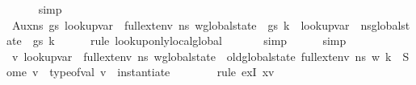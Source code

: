 \begin{isabellebody}
\ \ \ \ \isamarkupfalse%
\ simp\isanewline
\ \ \isamarkupfalse%
\ Aux{}{\isacharcolon}{\kern0pt}{\isachardoublequoteopen}{\isasymAnd}n{\isacharunderscore}{\kern0pt}s\ gs{\isachardot}{\kern0pt}\ lookup{\isacharunderscore}{\kern0pt}var\ {\isasymLambda}\ {\isacharparenleft}{\kern0pt}{\isacharparenleft}{\kern0pt}full{\isacharunderscore}{\kern0pt}ext{\isacharunderscore}{\kern0pt}env\ n{\isacharunderscore}{\kern0pt}s\ w{\isacharparenright}{\kern0pt}{\isasymlparr}global{\isacharunderscore}{\kern0pt}state\ {\isacharcolon}{\kern0pt}{\isacharequal}{\kern0pt}\ gs{\isasymrparr}{\isacharparenright}{\kern0pt}\ k\ {\isacharequal}{\kern0pt}\ lookup{\isacharunderscore}{\kern0pt}var\ {\isasymLambda}\ {\isacharparenleft}{\kern0pt}n{\isacharunderscore}{\kern0pt}s{\isasymlparr}global{\isacharunderscore}{\kern0pt}state\ {\isacharcolon}{\kern0pt}{\isacharequal}{\kern0pt}\ gs{\isasymrparr}{\isacharparenright}{\kern0pt}\ k{\isachardoublequoteclose}\isanewline
\ \ \ \ \isamarkupfalse%
\ {\isacharparenleft}{\kern0pt}rule\ lookup{\isacharunderscore}{\kern0pt}only{\isacharunderscore}{\kern0pt}local{\isacharunderscore}{\kern0pt}global{\isacharparenright}{\kern0pt}\isanewline
\ \ \ \ \ \isamarkupfalse%
\ simp\isanewline
\ \ \ \ \isamarkupfalse%
\ simp\isanewline
\ \ \ \ \isamarkupfalse%
\isanewline
\ \ \isamarkupfalse%
\ {\isachardoublequoteopen}{\isacharparenleft}{\kern0pt}{\isasymexists}v{\isachardot}{\kern0pt}\ lookup{\isacharunderscore}{\kern0pt}var\ {\isasymLambda}\ {\isacharparenleft}{\kern0pt}{\isacharparenleft}{\kern0pt}full{\isacharunderscore}{\kern0pt}ext{\isacharunderscore}{\kern0pt}env\ n{\isacharunderscore}{\kern0pt}s\ w{\isacharparenright}{\kern0pt}{\isasymlparr}global{\isacharunderscore}{\kern0pt}state\ {\isacharcolon}{\kern0pt}{\isacharequal}{\kern0pt}\ old{\isacharunderscore}{\kern0pt}global{\isacharunderscore}{\kern0pt}state\ {\isacharparenleft}{\kern0pt}full{\isacharunderscore}{\kern0pt}ext{\isacharunderscore}{\kern0pt}env\ n{\isacharunderscore}{\kern0pt}s\ w{\isacharparenright}{\kern0pt}{\isasymrparr}{\isacharparenright}{\kern0pt}\ k\ {\isacharequal}{\kern0pt}\ Some\ v\ {\isasymand}\ type{\isacharunderscore}{\kern0pt}of{\isacharunderscore}{\kern0pt}val\ v\ {\isacharequal}{\kern0pt}\ instantiate\ {\isasymOmega}\ {\isasymtau}{\isacharparenright}{\kern0pt}{\isachardoublequoteclose}\isanewline
\ \ \ \ \isamarkupfalse%
\ {\isacharparenleft}{\kern0pt}rule\ exI{\isacharbrackleft}{\kern0pt}\ {\isacharquery}{\kern0pt}x{\isacharequal}{\kern0pt}v{\isacharbrackright}{\kern0pt}{\isacharparenright}{\kern0pt}\isanewline

\end{isabellebody}
